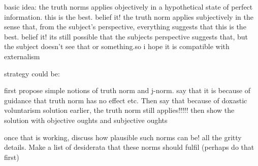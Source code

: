 \documentclass[12pt,numbers=noenddot]{scrartcl}
\begin{document}
basic idea: the truth norms applies objectively in a hypothetical state of perfect information. this is the best. belief it!
the truth norm applies subjectively in the sense that, from the subject's perspective, everything suggests that this is the best. belief it!
its still possible that the subjects perspective suggests that, but the subject doesn't see that or something.so i hope it is compatible with externalism

strategy could be:

first propose simple notions of truth norm and j-norm. say that it is because of guidance that truth norm has no effect etc. Then say that because of doxastic voluntarism solution earlier, the truth norm still applies!!!!! then show the solution with objective oughts and subjective oughts

once that is working, discuss how plausible such norms can be! all the gritty details. Make a list of desiderata that these norms should fulfil (perhaps do that first)




\end{document}
